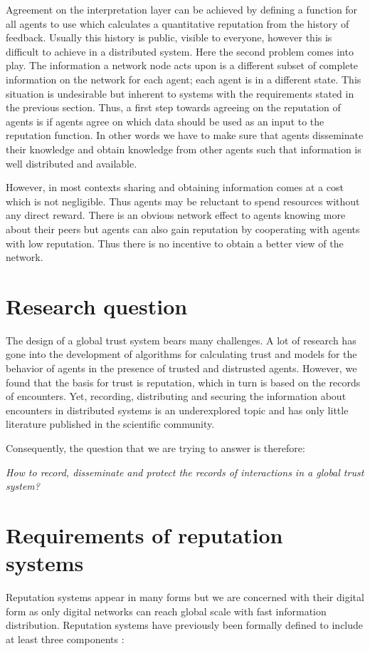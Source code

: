 Agreement on the interpretation layer can be achieved by defining a function for all agents to use
which calculates a quantitative reputation from the history of feedback. Usually this history is 
public, visible to everyone, however this is difficult to achieve in a distributed system. Here the
second problem comes into play. The information a network node acts upon 
is a different subset of complete information on the network for each agent; each agent is 
in a different state. This situation is undesirable but inherent to systems with the requirements 
stated in the previous section. Thus, a first step towards agreeing on the reputation of agents is 
if agents agree on which data should be used as an input to the reputation function. In 
other words we have to make sure that agents disseminate their knowledge and obtain knowledge from 
other agents such that information is well distributed and available.

However, in most contexts sharing and obtaining information comes at a cost which is not negligible.
Thus agents may be reluctant to spend resources without any direct reward. There is an obvious 
network effect to agents knowing more about their peers but agents can also gain reputation by 
cooperating with agents with low reputation. Thus there is no incentive to obtain a better view of
the network.

\section{Research question}
The design of a global trust system bears many challenges. A lot of research has gone into the
development of algorithms for calculating trust and models for the behavior of agents in the presence
of trusted and distrusted agents. However, we found that the basis for trust is reputation, which in 
turn is based on the records of encounters. Yet, recording, distributing and securing
the information about encounters in distributed systems is an underexplored topic and has only 
little literature published in the scientific community.

Consequently, the question that we are trying to answer is therefore:
\begin{center}
    \textit{How to record, disseminate and protect the records of interactions in a global trust system?}
\end{center}

\section{Requirements of reputation systems}
Reputation systems appear in many forms but we are concerned with their digital form as only
digital networks can reach global scale with fast information distribution. Reputation systems have
previously been formally defined to include at least three components \cite{resnick2000}:

